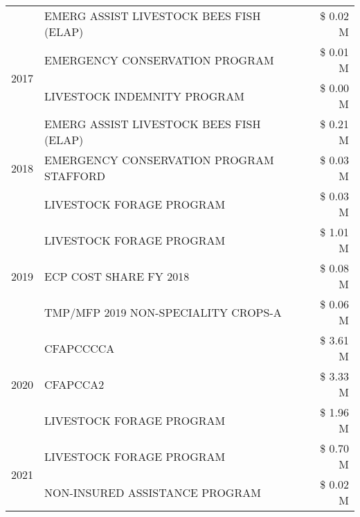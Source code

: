 \begin{tabular}{llr}
 & EMERG ASSIST LIVESTOCK BEES FISH (ELAP) & \$ 0.02 M \\
\cline{1-3}
\multirow[t]{2}{*}{2017} & EMERGENCY CONSERVATION PROGRAM & \$ 0.01 M \\
 & LIVESTOCK INDEMNITY PROGRAM & \$ 0.00 M \\
\cline{1-3}
\multirow[t]{3}{*}{2018} & EMERG ASSIST LIVESTOCK BEES FISH (ELAP) & \$ 0.21 M \\
 & EMERGENCY CONSERVATION PROGRAM STAFFORD & \$ 0.03 M \\
 & LIVESTOCK FORAGE PROGRAM & \$ 0.03 M \\
\cline{1-3}
\multirow[t]{3}{*}{2019} & LIVESTOCK FORAGE PROGRAM & \$ 1.01 M \\
 & ECP COST SHARE FY 2018 & \$ 0.08 M \\
 & TMP/MFP 2019 NON-SPECIALITY CROPS-A & \$ 0.06 M \\
\cline{1-3}
\multirow[t]{3}{*}{2020} & CFAPCCCCA & \$ 3.61 M \\
 & CFAPCCA2 & \$ 3.33 M \\
 & LIVESTOCK FORAGE PROGRAM & \$ 1.96 M \\
\cline{1-3}
\multirow[t]{2}{*}{2021} & LIVESTOCK FORAGE PROGRAM & \$ 0.70 M \\
 & NON-INSURED ASSISTANCE PROGRAM & \$ 0.02 M \\
\cline{1-3}
\bottomrule
\end{tabular}
